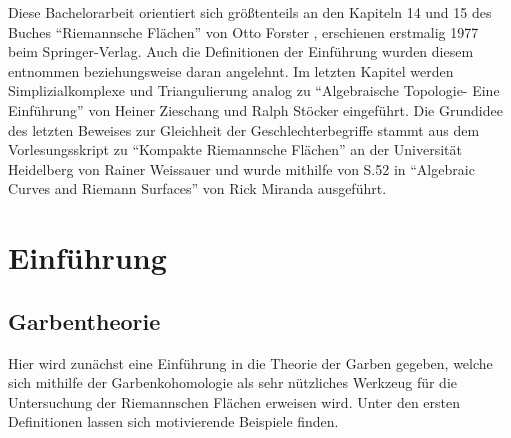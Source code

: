\documentclass[11pt,a4paper,toc=bibliography]{scrartcl}
\theoremstyle{def}
\theoremstyle{thm}
\theoremstyle{remark}
\begin{document}
Diese Bachelorarbeit orientiert sich größtenteils an den Kapiteln 14 und 15 des Buches "`Riemannsche Flächen"' von Otto Forster \cite{forster}, erschienen erstmalig 1977 beim Springer-Verlag. Auch die Definitionen der Einführung wurden diesem entnommen beziehungsweise daran angelehnt. Im letzten Kapitel werden Simplizialkomplexe und Triangulierung analog zu "`Algebraische Topologie- Eine Einführung"' von Heiner Zieschang und Ralph Stöcker \cite{algTop} eingeführt. Die Grundidee des letzten Beweises zur Gleichheit der Geschlechterbegriffe stammt aus dem Vorlesungsskript zu "`Kompakte Riemannsche Flächen"' an der Universität Heidelberg von Rainer Weissauer \cite{weissauer} und wurde mithilfe von S.52 in "`Algebraic Curves and Riemann Surfaces"' von Rick Miranda \cite{algCur} ausgeführt.

\newpage






\section{Einführung}

\subsection{Garbentheorie}
Hier wird zunächst eine Einführung in die Theorie der Garben gegeben, welche sich mithilfe der Garbenkohomologie als sehr nützliches Werkzeug für die Untersuchung der Riemannschen Flächen erweisen wird. 	Unter den ersten Definitionen lassen sich motivierende Beispiele finden.
\end{document}

